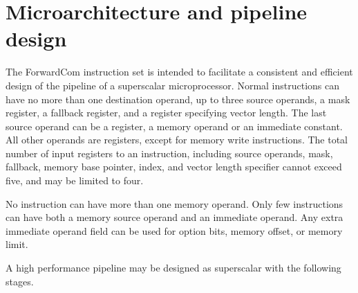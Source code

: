 \documentclass[forwardcom.tex]{subfiles}
\begin{document}
\RaggedRight

\chapter{Microarchitecture and pipeline design}
The ForwardCom instruction set is intended to facilitate a consistent and efficient design of the pipeline of a superscalar microprocessor. Normal instructions can have no more than one destination operand, up to three source operands, a mask register, a fallback register, and a register specifying vector length. The last source operand can be a register, a memory operand or an immediate constant. All other operands are registers, except for memory write instructions. The total number of input registers to an instruction, including source operands, mask, fallback, memory base pointer, index, and vector length specifier cannot exceed five, and may be limited to four.
\vspace{2mm}

No instruction can have more than one memory operand. Only few instructions can have both a memory source operand and an immediate operand. Any extra immediate operand field can be used for option bits, memory offset, or memory limit. 
\vspace{2mm}

A high performance pipeline may be designed as superscalar with the following stages.
\end{document}
